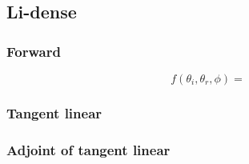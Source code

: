 %
\subsection{Li-dense}
\label{sec:brdf_kernels-li_dense}

\subsubsection{Forward}
\label{sec:brdf_kernels-li_dense-forward}

\begin{equation}
f(\theta_{i}, \theta_{r}, \phi) =
\label{eq:brdf_kernels-li_dense-forward-f}
\end{equation}


\subsubsection{Tangent linear}
\label{sec:brdf_kernels-li_dense-tangent_linear}


\subsubsection{Adjoint of tangent linear}
\label{sec:brdf_kernels-li_dense-adjoint_of_tangent_linear}

